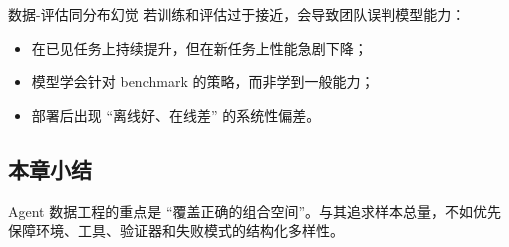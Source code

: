 \begin{warningbox}{数据-评估同分布幻觉}
若训练和评估过于接近，会导致团队误判模型能力：
\begin{itemize}
    \item 在已见任务上持续提升，但在新任务上性能急剧下降；
    \item 模型学会针对 benchmark 的策略，而非学到一般能力；
    \item 部署后出现 ``离线好、在线差'' 的系统性偏差。
\end{itemize}
\end{warningbox}

\subsection{本章小结}
Agent 数据工程的重点是 ``覆盖正确的组合空间''。与其追求样本总量，不如优先保障环境、工具、验证器和失败模式的结构化多样性。

